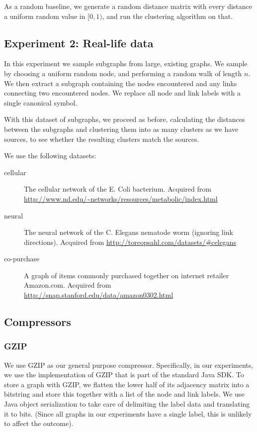 \documentclass{article}
\begin{document}
As a random baseline, we generate a random distance matrix with every distance a uniform random value in $[0, 1)$, and run the clustering algorithm on that.

\subsection*{Experiment 2: Real-life data} 

In this experiment we sample subgraphs from large, existing graphs. We sample by choosing a uniform random node, and performing a random walk of length $n$. We then extract a subgraph containing the nodes encountered and any links connecting two encountered nodes. We replace all node  and link labels with a single canonical symbol.

With this dataset of subgraphs, we proceed as before, calculating the distances between the subgraphs and clustering them into as many clusters as we have sources, to see whether the resulting clusters match the sources.

We use the following datasets:
\begin{description}
	\item[cellular] The cellular network of the E. Coli bacterium. \cite{jeong2000large} Acquired from \url{http://www.nd.edu/~networks/resources/metabolic/index.html}
	\item[neural] The neural network of the C. Elegans nematode worm (ignoring link directions). \cite{achacoso1991ay,watts1998small} Acquired from \url{http://toreopsahl.com/datasets/#celegans}
	\item[co-purchase] A graph of items commonly purchased together on internet retailer Amazon.com. \cite{leskovec2007dynamics} Acquired from \url{http://snap.stanford.edu/data/amazon0302.html}
\end{description}

\subsection*{Compressors}

\subsubsection*{GZIP}

We use GZIP as our general purpose compressor. Specifically, in our experiments, we use the implementation of GZIP that is part of the standard Java SDK. To store a graph with GZIP, we flatten the lower half of its adjacency matrix into a bitstring and store this together with a list of the node and link labels. We use Java object serialization to take care of delimiting the label data and translating it to bits. (Since all graphs in our experiments have a single label, this is unlikely to affect the outcome).
\end{document}
